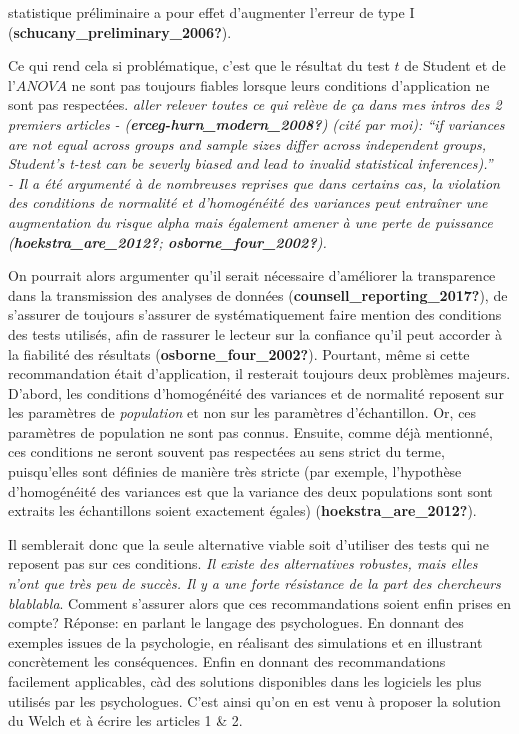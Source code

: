 \documentclass[
  english,
  man]{apa6}
\begin{document}
statistique préliminaire a pour effet d'augmenter l'erreur de type I (\textbf{schucany\_preliminary\_2006?}).

Ce qui rend cela si problématique, c'est que le résultat du test \(t\) de Student et de l'\(ANOVA\) ne sont pas toujours fiables lorsque leurs conditions d'application ne sont pas respectées. \emph{aller relever toutes ce qui relève de ça dans mes intros des 2 premiers articles}
\emph{- (\textbf{erceg-hurn\_modern\_2008?}) (cité par moi): ``if variances are not equal across groups and sample sizes differ across independent groups, Student's t-test can be severly biased and lead to invalid statistical inferences).''\\
- Il a été argumenté à de nombreuses reprises que dans certains cas, la violation des conditions de normalité et d'homogénéité des variances peut entraîner une augmentation du risque alpha mais également amener à une perte de puissance (\textbf{hoekstra\_are\_2012?}; \textbf{osborne\_four\_2002?}). }

On pourrait alors argumenter qu'il serait nécessaire d'améliorer la transparence dans la transmission des analyses de données (\textbf{counsell\_reporting\_2017?}), de s'assurer de toujours s'assurer de systématiquement faire mention des conditions des tests utilisés, afin de rassurer le lecteur sur la confiance qu'il peut accorder à la fiabilité des résultats (\textbf{osborne\_four\_2002?}). Pourtant, même si cette recommandation était d'application, il resterait toujours deux problèmes majeurs. D'abord, les conditions d'homogénéité des variances et de normalité reposent sur les paramètres de \emph{population} et non sur les paramètres d'échantillon. Or, ces paramètres de population ne sont pas connus. Ensuite, comme déjà mentionné, ces conditions ne seront souvent pas respectées au sens strict du terme, puisqu'elles sont définies de manière très stricte (par exemple, l'hypothèse d'homogénéité des variances est que la variance des deux populations sont sont extraits les échantillons soient exactement égales) (\textbf{hoekstra\_are\_2012?}).

Il semblerait donc que la seule alternative viable soit d'utiliser des tests qui ne reposent pas sur ces conditions. \emph{Il existe des alternatives robustes, mais elles n'ont que très peu de succès. Il y a une forte résistance de la part des chercheurs blablabla}. Comment s'assurer alors que ces recommandations soient enfin prises en compte? Réponse: en parlant le langage des psychologues. En donnant des exemples issues de la psychologie, en réalisant des simulations et en illustrant concrètement les conséquences. Enfin en donnant des recommandations facilement applicables, càd des solutions disponibles dans les logiciels les plus utilisés par les psychologues. C'est ainsi qu'on en est venu à proposer la solution du Welch et à écrire les articles 1 \& 2.
\end{document}
